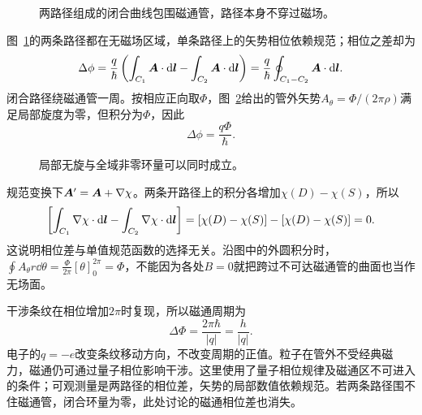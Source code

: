 \begin{figure}[H]\centering
{}
\caption{两路径组成的闭合曲线包围磁通管，路径本身不穿过磁场。}\label{fig:i1-e11-q}
\end{figure}
\begin{solution}
图~\ref{fig:i1-e11-q}的两条路径都在无磁场区域，单条路径上的矢势相位依赖规范；相位之差却为
\[\Delta\phi=\frac q\hbar\left(\int_{C_1}\bm{A}\cdot\mathop{}\!\mathrm d\bm{l}-\int_{C_2}\bm{A}\cdot\mathop{}\!\mathrm d\bm{l}\right)
=\frac q\hbar\oint_{C_1-C_2}\bm{A}\cdot\mathop{}\!\mathrm d\bm{l}.
\]
闭合路径绕磁通管一周。按相应正向取$\Phi$，图~\ref{fig:i1-e11-s}给出的管外矢势$A_\theta=\Phi/(2\pi\rho)$满足局部旋度为零，但积分为$\Phi$，因此
\[\boxed{\Delta\phi=\frac{q\Phi}{\hbar}}.
\]

\begin{figure}[H]\centering
{}
\caption{局部无旋与全域非零环量可以同时成立。}\label{fig:i1-e11-s}
\end{figure}

规范变换下$\bm{A}'=\bm{A}+\nabla\chi$。两条开路径上的积分各增加$\chi(D)-\chi(S)$，所以
\[
\left[\int_{C_1}\nabla\chi\cdot\mathop{}\!\mathrm d\bm{l}
-\int_{C_2}\nabla\chi\cdot\mathop{}\!\mathrm d\bm{l}\right]
=[\chi(D)-\chi(S)]-[\chi(D)-\chi(S)]=0.
\]
这说明相位差与单值规范函数的选择无关。沿图中的外圆积分时，
$\oint A_\theta r\dd\theta=\frac{\Phi}{2\pi}[\theta]_0^{2\pi}=\Phi$，不能因为各处$B=0$就把跨过不可达磁通管的曲面也当作无场面。

干涉条纹在相位增加$2\pi$时复现，所以磁通周期为
\[\boxed{\Delta\Phi=\frac{2\pi\hbar}{|q|}=\frac h{|q|}}.
\]
电子的$q=-e$改变条纹移动方向，不改变周期的正值。粒子在管外不受经典磁力，磁通仍可通过量子相位影响干涉。这里使用了量子相位规律及磁通区不可进入的条件；可观测量是两路径的相位差，矢势的局部数值依赖规范。若两条路径围不住磁通管，闭合环量为零，此处讨论的磁通相位差也消失。
\end{solution}



